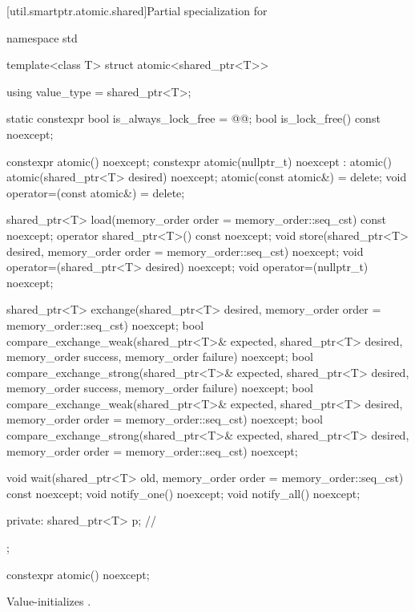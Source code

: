 [util.smartptr.atomic.shared]{Partial specialization for }
%
\begin{codeblock}
namespace std {
  template<class T> struct atomic<shared_ptr<T>> {
    using value_type = shared_ptr<T>;

    static constexpr bool is_always_lock_free = @@;
    bool is_lock_free() const noexcept;

    constexpr atomic() noexcept;
    constexpr atomic(nullptr_t) noexcept : atomic() { }
    atomic(shared_ptr<T> desired) noexcept;
    atomic(const atomic&) = delete;
    void operator=(const atomic&) = delete;

    shared_ptr<T> load(memory_order order = memory_order::seq_cst) const noexcept;
    operator shared_ptr<T>() const noexcept;
    void store(shared_ptr<T> desired, memory_order order = memory_order::seq_cst) noexcept;
    void operator=(shared_ptr<T> desired) noexcept;
    void operator=(nullptr_t) noexcept;

    shared_ptr<T> exchange(shared_ptr<T> desired,
                           memory_order order = memory_order::seq_cst) noexcept;
    bool compare_exchange_weak(shared_ptr<T>& expected, shared_ptr<T> desired,
                               memory_order success, memory_order failure) noexcept;
    bool compare_exchange_strong(shared_ptr<T>& expected, shared_ptr<T> desired,
                                 memory_order success, memory_order failure) noexcept;
    bool compare_exchange_weak(shared_ptr<T>& expected, shared_ptr<T> desired,
                               memory_order order = memory_order::seq_cst) noexcept;
    bool compare_exchange_strong(shared_ptr<T>& expected, shared_ptr<T> desired,
                                 memory_order order = memory_order::seq_cst) noexcept;

    void wait(shared_ptr<T> old, memory_order order = memory_order::seq_cst) const noexcept;
    void notify_one() noexcept;
    void notify_all() noexcept;

  private:
    shared_ptr<T> p;            // \expos
  };
}
\end{codeblock}

%
\begin{itemdecl}
constexpr atomic() noexcept;
\end{itemdecl}

\begin{itemdescr}
\pnum
\effects
Value-initializes .
\end{itemdescr}

